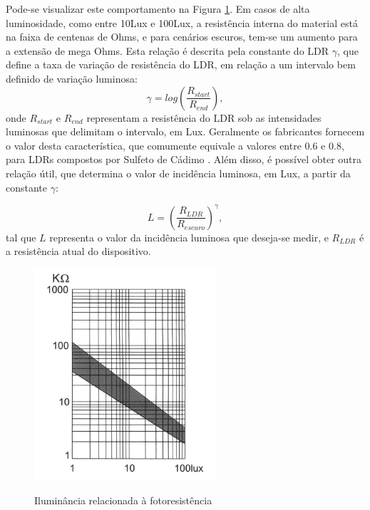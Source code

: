 \documentclass[oneside,openright,12pt]{ufsm_2015} %
\begin{document}
Pode-se visualizar este comportamento na Figura \ref{fig:ldr-graph}. Em casos de alta luminosidade, como entre 10Lux e 100Lux, a resistência interna do material está na faixa de centenas de Ohms, e para cenários escuros, tem-se um aumento para a extensão de mega Ohms. Esta relação é descrita pela constante do LDR $\gamma$, que define a taxa de variação de resistência do LDR, em relação a um intervalo bem definido de variação luminosa:
\begin{equation}
    \gamma = log(\frac {R_{start}}{R_{end}}),
\end{equation}
onde $R_{start}$ e $R_{end}$ representam a resistência do LDR sob as intensidades luminosas que delimitam o intervalo, em Lux. Geralmente os fabricantes fornecem o valor desta característica, que comumente equivale a valores entre 0.6 e 0.8, para LDRs compostos por Sulfeto de Cádimo \cite{Lightdep67:online}. Além disso, é possível obter outra relação útil, que determina o valor de incidência luminosa, em Lux, a partir da constante $\gamma$:

\begin{equation}
    L = (\frac{R_{LDR}}{R_{escuro}})^\gamma ,
\end{equation}
tal que $L$ representa o valor da incidência luminosa que deseja-se medir, e $R_{LDR}$ é a resistência atual do dispositivo.

\begin{figure}[ht]
    \caption{\label{exepretex} Iluminância relacionada à fotoresistência}
    \centering
    \includegraphics[width=0.6\textwidth]{figuras/ldrgraph.png}
    \vspace{\baselineskip} %
        \label{fig:ldr-graph}
\end{figure}
\end{document}
